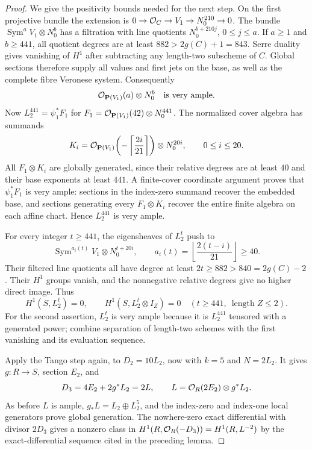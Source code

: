 \begin{proof}
We give the positivity bounds needed for the next step.  On the first projective bundle the extension is $0\to\mathcal O_C\to V_1\to N_0^{210}\to0$.  The bundle $\operatorname{Sym}^aV_1\otimes N_0^b$ has a filtration with line quotients $N_0^{b+210j}$, $0\leq j\leq a$.  If $a\geq1$ and $b\geq441$, all quotient degrees are at least $882>2g(C)+1=843$.  Serre duality gives vanishing of $H^1$ after subtracting any length-two subscheme of $C$.  Global sections therefore supply all values and first jets on the base, as well as the complete fibre Veronese system.  Consequently
\[
                   \mathcal O_{\mathbf P(V_1)}(a)\otimes N_0^b
                   \quad\hbox{is very ample}.
\]
Now $L_2^{441}=\psi_1^*F_1$ for
$F_1=\mathcal O_{\mathbf P(V_1)}(42)\otimes N_0^{441}$.
The normalized cover algebra has summands
\[
 K_i=\mathcal O_{\mathbf P(V_1)}\!\left(-\left\lceil\frac{2i}{21}\right\rceil\right)
                      \otimes N_0^{20i},\qquad 0\leq i\leq20.
\]
All $F_1\otimes K_i$ are globally generated, since their relative degrees are at least $40$ and their base exponents at least $441$.  A finite-cover coordinate argument proves that $\psi_1^*F_1$ is very ample: sections in the index-zero summand recover the embedded base, and sections generating every $F_1\otimes K_i$ recover the entire finite algebra on each affine chart.  Hence $L_2^{441}$ is very ample.

For every integer $t\geq441$, the eigensheaves of $L_2^t$ push to
\[
 \operatorname{Sym}^{a_i(t)}V_1\otimes N_0^{t+20i},
 \qquad a_i(t)=\left\lfloor\frac{2(t-i)}{21}\right\rfloor\geq40.
\]
Their filtered line quotients all have degree at least $2t\geq882>840=2g(C)-2$.  Their $H^1$ groups vanish, and the nonnegative relative degrees give no higher direct image.  Thus
\begin{equation}\label{eq:OC-L2-jet-bound}
 H^1(S,L_2^t)=0,\qquad
 H^1(S,L_2^t\otimes I_Z)=0
 \quad(t\geq441,\ \operatorname{length}Z\leq2).
\end{equation}
For the second assertion, $L_2^t$ is very ample because it is $L_2^{441}$ tensored with a generated power; combine separation of length-two schemes with the first vanishing and its evaluation sequence.

Apply the Tango step again, to $D_2=10L_2$, now with $k=5$ and $N=2L_2$.  It gives $g:R\to S$, section $E_2$, and
\[
              D_3=4E_2+2g^*L_2=2L,
 \qquad L=\mathcal O_R(2E_2)\otimes g^*L_2.
\]
As before $L$ is ample, $g_*L=L_2\oplus L_2^5$, and the index-zero and index-one local generators prove global generation.  The nowhere-zero exact differential with divisor $2D_3$ gives a nonzero class in
$H^1(R,\mathcal O_R(-D_3))=H^1(R,L^{-2})$ by the exact-differential sequence cited in the preceding lemma.


\end{proof}
